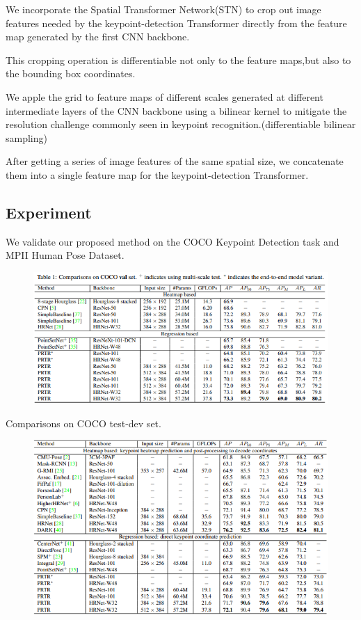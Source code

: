 \documentclass[11pt]{article}
\begin{document}
We incorporate the Spatial Transformer Network(STN) to crop out image features needed by the keypoint-detection Transformer directly from the feature map generated by the first CNN backbone.

This cropping operation is differentiable not only to the feature maps,but also to the bounding box coordinates.

We apple the grid to feature maps of different scales generated at different intermediate layers of the CNN backbone using a bilinear kernel to mitigate the resolution challenge commonly seen in keypoint recognition.(differentiable bilinear sampling)

After getting a series of image features of the same spatial size, we concatenate them into a single feature map for the keypoint-detection Transformer.
\subsection{Experiment}
We validate our proposed method on the COCO Keypoint Detection task and MPII Human Pose Dataset.
\begin{figure}[H]
	\centering
	\includegraphics[scale = 0.6]{32}
\end{figure}

Comparisons on COCO test-dev set.
\begin{figure}[H]
	\centering
	\includegraphics[scale = 0.6]{33}
\end{figure}
\end{document}
